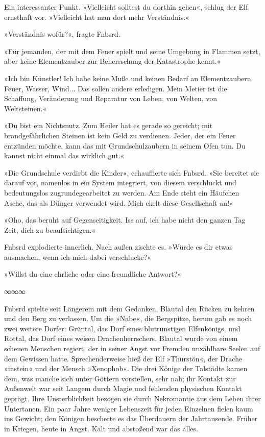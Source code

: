 Ein interessanter Punkt. »Vielleicht solltest du dorthin gehen«, schlug der Elf ernsthaft vor. »Vielleicht hat man dort mehr Verständnis.«

»Verständnis wofür?«, fragte Fnbsrd.

»Für jemanden, der mit dem Feuer spielt und seine Umgebung in Flammen setzt, aber keine Elementzauber zur Beherrschung der Katastrophe kennt.«

»Ich bin Künstler! Ich habe keine Muße und keinen Bedarf an Elementzaubern. Feuer, Wasser, Wind... Das sollen andere erledigen. Mein Metier ist die Schaffung, Veränderung und Reparatur von Leben, von Welten, von Weltsteinen.«

»Du bist ein Nichtsnutz. Zum Heiler hat es gerade so gereicht; mit brandgefährlichen Steinen ist kein Geld zu verdienen. Jeder, der ein Feuer entzünden möchte, kann das mit Grundschulzaubern in seinem Ofen tun. Du kannst nicht einmal das wirklich gut.«

»Die Grundschule verdirbt die Kinder«, echauffierte sich Fnbsrd. »Sie bereitet sie darauf vor, namenlos in ein System integriert, von diesem verschluckt und bedeutungslos zugrundegearbeitet zu werden. Am Ende steht ein Häufchen Asche, das als Dünger verwendet wird. Mich ekelt diese Gesellschaft an!«

»Oho, das beruht auf Gegenseitigkeit. Iss auf, ich habe nicht den ganzen Tag Zeit, dich zu beaufsichtigen.«

Fnbsrd explodierte innerlich. Nach außen zischte es. »Würde es dir etwas ausmachen, wenn ich mich dabei verschlucke?«

»Willst du eine ehrliche oder eine freundliche Antwort?«

\begin{center}
∞∞∞
\end{center}

Fnbsrd spielte seit Längerem mit dem Gedanken, Blautal den Rücken zu kehren und den Berg zu verlassen. Um die »Nabe«, die Bergspitze, herum gab es noch zwei weitere Dörfer: Grüntal, das Dorf eines blutrünstigen Elfenkönigs, und Rottal, das Dorf eines weisen Drachenherrschers. Blautal wurde von einem scheuen Menschen regiert, der in seiner Angst vor Fremden unzählbare Seelen auf dem Gewissen hatte. Sprechenderweise hieß der Elf »Thürstön«, der Drache »instein« und der Mensch »Xenophob«. Die drei Könige der Talstädte kamen dem, was manche sich unter Göttern vorstellen, sehr nah; ihr Kontakt zur Außenwelt war seit Langem durch Magie und fehlenden physischen Kontakt geprägt. Ihre Unsterblichkeit bezogen sie durch Nekromantie aus dem Leben ihrer Untertanen. Ein paar Jahre weniger Lebenszeit für jeden Einzelnen fielen kaum ins Gewicht; den Königen bescherte es das Überdauern der Jahrtausende. Früher in Kriegen, heute in Angst. Kalt und abstoßend war das alles.

